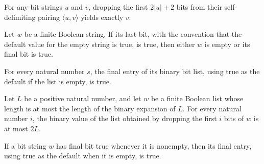 \begin{lemma}
\label{Complexity.Codec.pe_drop}
\leanok
{}
For any bit strings $u$ and $v$, dropping the first $2|u|+2$ bits from their
self-delimiting pairing $\langle u,v\rangle$ yields exactly $v$.
\end{lemma}

\begin{lemma}
\label{Complexity.Codec.canon_of_getLastD}
\leanok
{}
Let $w$ be a finite Boolean string. If its last bit, with the convention that the
default value for the empty string is true, is true, then either $w$ is empty or its
final bit is true.
\end{lemma}

\begin{lemma}
\label{Complexity.Codec.getLastD_bits}
\leanok
{}
For every natural number $s$, the final entry of its binary bit list, using true as the
default if the list is empty, is true.
\end{lemma}

\begin{lemma}
\label{Complexity.Codec.bitsVal_le_of_width}
\leanok
{}
Let $L$ be a positive natural number, and let $w$ be a finite Boolean list whose length
is at most the length of the binary expansion of $L$. For every natural number $i$, the
binary value of the list obtained by dropping the first $i$ bits of $w$ is at most $2L$.
\end{lemma}

\begin{lemma}
\label{Complexity.Codec.getLastD_of_canon}
\leanok
{}
If a bit string $w$ has final bit true whenever it is nonempty, then its final entry,
using true as the default when it is empty, is true.
\end{lemma}

